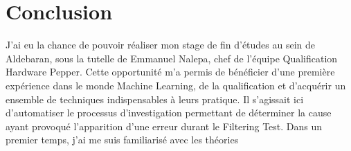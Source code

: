 \chapter{Conclusion}
\label{Conclusion}
\thispagestyle{fancy}

J'ai eu la chance de pouvoir réaliser mon stage de fin d'études au sein de Aldebaran, sous la tutelle de Emmanuel Nalepa, chef de l'équipe Qualification Hardware Pepper. Cette opportunité m’a permis de bénéficier d’une première expérience dans le monde Machine Learning, de la qualification et d’acquérir un ensemble de techniques indispensables à leurs pratique. Il s’agissait ici d'automatiser le processus d'investigation permettant de déterminer la cause ayant provoqué l'apparition d'une erreur durant le Filtering Test.
\newline
\newline
Dans un premier temps, j'ai me suis familiarisé avec les théories 